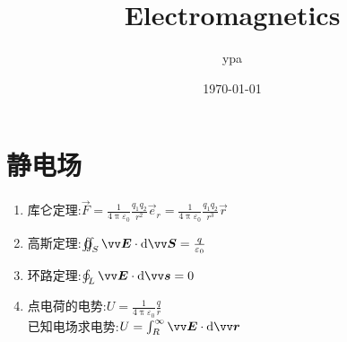\documentclass{article}
\title{Electromagnetics}
\author{ypa}
\date{\today}
\begin{document}
\maketitle
\tableofcontents

\section{静电场}
\begin{enumerate}[label=\arabic*.]
  \item 库仑定理:$\vec{F} = \frac{1}{4\uppi \varepsilon_0}\frac{q_1 q_2}{r^2}\vec{e}_r = \frac{1}{4\uppi \varepsilon_0}\frac{q_1 q_2}{r^3}\vec{r}$
  \item 高斯定理:$\oiint_S \vec{E}\cdot\dif\vec{S} = \frac{q}{\varepsilon_0}$
  \item 环路定理:$\oint_L \vec{E}\cdot\dif\vec{s} = 0$
  \item 点电荷的电势:$U = \frac{1}{4\uppi \varepsilon_0}\frac{q}{r}$\\
        已知电场求电势:$U=\int_{R}^{\infty}\vec{E}\cdot\dif\vec{r}$
\end{enumerate}
\end{document}
